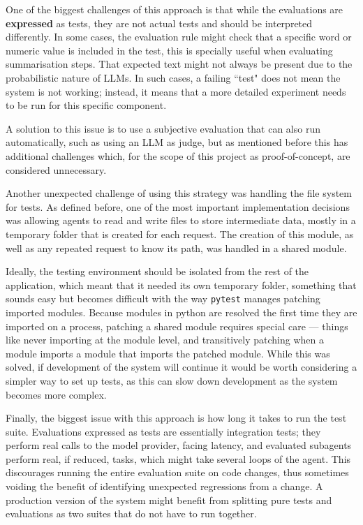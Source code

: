 \documentclass[a4paper]{report}
\begin{document}
One of the biggest challenges of this approach is that while the evaluations are \textbf{expressed} as tests, they are not actual tests and should be interpreted differently. In some cases, the evaluation rule might check that a specific word or numeric value is included in the test, this is specially useful when evaluating summarisation steps. That expected text might not always be present due to the probabilistic nature of LLMs. In such cases, a failing ``test" does not mean the system is not working; instead, it means that a more detailed experiment needs to be run for this specific component.

A solution to this issue is to use a subjective evaluation that can also run automatically, such as using an LLM as judge, but as mentioned before this has additional challenges which, for the scope of this project as proof-of-concept, are considered unnecessary.

Another unexpected challenge of using this strategy was handling the file system for tests. As defined before, one of the most important implementation decisions was allowing agents to read and write files to store intermediate data, mostly in a temporary folder that is created for each request. The creation of this module, as well as any repeated request to know its path, was handled in a shared module.

Ideally, the testing environment should be isolated from the rest of the application, which meant that it needed its own temporary folder, something that sounds easy but becomes difficult with the way \texttt{pytest} manages patching imported modules. Because modules in python are resolved the first time they are imported on a process, patching a shared module requires special care --- things like never importing at the module level, and transitively patching when a module imports a module that imports the patched module. While this was solved, if development of the system will continue it would be worth considering a simpler way to set up tests, as this can slow down development as the system becomes more complex.

Finally, the biggest issue with this approach is how long it takes to run the test suite. Evaluations expressed as tests are essentially integration tests; they perform real calls to the model provider, facing latency, and evaluated subagents perform real, if reduced, tasks, which might take several loops of the agent. This discourages running the entire evaluation suite on code changes, thus sometimes voiding the benefit of identifying unexpected regressions from a change. A production version of the system might benefit from splitting pure tests and evaluations as two suites that do not have to run together.
\end{document}
